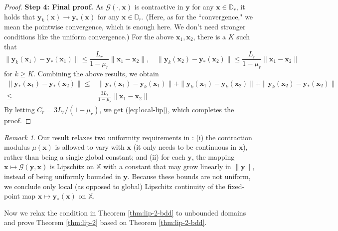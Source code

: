 \documentclass{amsart} %
\def\eqref#1{equation~\ref{#1}}
\def\vx{{\bm{x}}}
\def\vy{{\bm{y}}}
\def\sD{{\mathbb{D}}}
\def\sX{{\mathbb{X}}}
\def\cG{{\mathcal{G}}}
\theoremstyle{definition}
\theoremstyle{remark}
\newtheorem{remark}[theorem]{Remark}
\renewcommand{\eqref}[1]{\textup{(\ref{#1})}}
\begin{document}
\begin{proof}
\textbf{Step 4: Final proof.}
As $\cG(\cdot,\vx)$ is contractive in $\vy$ for any $\vx \in \sD_r$, it holds that $\vy_k(\vx) \to \vy_\ast(\vx)$ for any $\vx \in \sD_r$. (Here, as for the ``convergence," we mean the pointwise convergence, which is enough here. We don't need stronger conditions like the uniform convergence.) For the above $\vx_1,\vx_2$, there is a $K$ such that
\[ \|\vy_k(\vx_1) - \vy_\ast(\vx_1)\| \leq \frac{L_r}{1-\mu_r} \| \vx_1 - \vx_2 \|, \quad \|\vy_k(\vx_2) - \vy_\ast(\vx_2)\| \leq \frac{L_r}{1-\mu_r} \| \vx_1 - \vx_2 \| \]
for $k \geq K$. Combining the above results, we obtain
\begin{align*}
\| \vy_\ast(\vx_1) - \vy_\ast(\vx_2) \| 
\leq & \|\vy_\ast(\vx_1) - \vy_k(\vx_1)\| + \| \vy_{k}(\vx_1) - \vy_{k}(\vx_2)\| + \|\vy_k(\vx_2) - \vy_\ast(\vx_2)\| \\
\leq & \frac{3 L_r}{1-\mu_r} \| \vx_1 - \vx_2 \| 
\end{align*}
By letting $C_r = 3L_r / (1-\mu_r)$, we get \eqref{eq:local-lip}, which completes the proof.
\end{proof}

\begin{remark}
    Our result relaxes two uniformity requirements in \cite[Thm. 1A.4]{dontchev2009implicit}: (i) the contraction modulus $\mu(\vx)$ is allowed to vary with $\vx$ (it only needs to be continuous in $\vx$), rather than being a single global constant; and (ii) for each $\vy$, the mapping $\vx \mapsto \cG(\vy,\vx)$ is Lipschitz on $\sX$ with a constant that may grow linearly in $\|\vy\|$, instead of being uniformly bounded in $\vy$. Because these bounds are not uniform, we conclude only local (as opposed to global) Lipschitz continuity of the fixed-point map $\vx \mapsto \vy_\ast(\vx)$ on $\sX$.
\end{remark} 

Now we relax the condition in Theorem \ref{thm:lip-2-bdd} to unbounded domains and prove Theorem \ref{thm:lip-2} based on Theorem \ref{thm:lip-2-bdd}.
\end{document}
